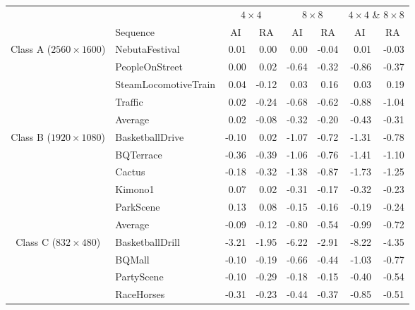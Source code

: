 \documentclass[11pt,a4paper,openright,twoside]{book}
\numberwithin{equation}{section} %
\numberwithin{figure}{section} %
\numberwithin{table}{section} %
\begin{document}
\begin{table}[tb]
	\centering
	\small
	\begin{tabularx}{\textwidth}{c|X|rr|rr|rr}
		\multicolumn{2}{c}{} &
		\multicolumn{2}{c|}{$4\times4$} &
		\multicolumn{2}{c|}{$8\times8$} &
		\multicolumn{2}{c}{$4\times4$ \& $8\times8$} \\
		\cline{2-8}
		\multicolumn{1}{c}{} & {Sequence} &
		\multicolumn{1}{c}{ \acs{AI}} & \multicolumn{1}{c|}{ \acs{RA}} &
		\multicolumn{1}{c}{ \acs{AI}} & \multicolumn{1}{c|}{ \acs{RA}} &
		\multicolumn{1}{c}{ \acs{AI}} & \multicolumn{1}{c}{ \acs{RA}} \\
		\hline
		\hline
		\multirow{5}{2cm}{\centering Class A ($2560\times1600$)}
		& NebutaFestival         &  0.01 &  0.00 &  0.00 & -0.04 &  0.01 & -0.03 \\
		& PeopleOnStreet         &  0.00 &  0.02 & -0.64 & -0.32 & -0.86 & -0.37 \\
		& SteamLocomotiveTrain   &  0.04 & -0.12 &  0.03 &  0.16 &  0.03 &  0.19 \\
		& Traffic                &  0.02 & -0.24 & -0.68 & -0.62 & -0.88 & -1.04 \\
		\cline{2-8} &
		Average                  &  0.02 & -0.08 & -0.32 & -0.20 & -0.43 & -0.31 \\
		\hline
		\hline
		\multirow{6}{2cm}{\centering Class B ($1920\times1080$)}
		& BasketballDrive        & -0.10 &  0.02 & -1.07 & -0.72 & -1.31 & -0.78 \\
		& BQTerrace              & -0.36 & -0.39 & -1.06 & -0.76 & -1.41 & -1.10 \\
		& Cactus                 & -0.18 & -0.32 & -1.38 & -0.87 & -1.73 & -1.25 \\
		& Kimono1                &  0.07 &  0.02 & -0.31 & -0.17 & -0.32 & -0.23 \\
		& ParkScene              &  0.13 &  0.08 & -0.15 & -0.16 & -0.19 & -0.24 \\
		\cline{2-8} &
		Average                  & -0.09 & -0.12 & -0.80 & -0.54 & -0.99 & -0.72 \\
		\hline
		\hline
		\multirow{5}{2cm}{\centering Class C ($832\times480$)}
		& BasketballDrill        & -3.21 & -1.95 & -6.22 & -2.91 & -8.22 & -4.35 \\
		& BQMall                 & -0.10 & -0.19 & -0.66 & -0.44 & -1.03 & -0.77 \\
		& PartyScene             & -0.10 & -0.29 & -0.18 & -0.15 & -0.40 & -0.54 \\
		& RaceHorses             & -0.31 & -0.23 & -0.44 & -0.37 & -0.85 & -0.51 \\

\end{tabularx}
\end{table}
\end{document}

